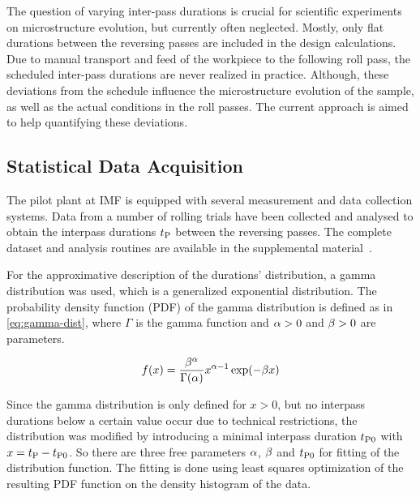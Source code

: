 The question of varying inter-pass durations is crucial for scientific experiments on microstructure evolution, but currently often neglected.
Mostly, only flat durations between the reversing passes are included in the design calculations.
Due to manual transport and feed of the workpiece to the following roll pass, the scheduled inter-pass durations are never realized in practice.
Although, these deviations from the schedule influence the microstructure evolution of the sample, as well as the actual conditions in the roll passes.
The current approach is aimed to help quantifying these deviations.

\subsection{Statistical Data Acquisition}\label{subsec:data-acquisition}

The pilot plant at IMF is equipped with several measurement and data collection systems.
Data from a number of rolling trials have been collected and analysed to obtain the interpass durations ${t_\mathrm{P}}$ between the reversing passes.
The complete dataset and analysis routines are available in the supplemental material~\cite{esaform2023_weiner_supp}.

For the approximative description of the durations' distribution, a gamma distribution was used, which is a generalized exponential distribution.
The probability density function (PDF) of the gamma distribution is defined as in \autoref{eq:gamma-dist}, where $\Gamma$ is the gamma function and ${\alpha} > 0$ and ${\beta} > 0$ are parameters.

\begin{equation}
    f(x) = \frac{{\beta}^{\alpha}}{\Gamma({\alpha})}x^{{\alpha} - 1} \exp(-{\beta} x)
    \label{eq:gamma-dist}
\end{equation}

Since the gamma distribution is only defined for $x>0$, but no interpass durations below a certain value occur due to technical restrictions, the distribution was modified by introducing a minimal interpass duration ${t_\mathrm{P0}}$ with $x = {t_\mathrm{P}} - {t_\mathrm{P0}}$.
So there are three free parameters ${\alpha}$, ${\beta}$ and ${t_\mathrm{P0}}$ for fitting of the distribution function.
The fitting is done using least squares optimization of the resulting PDF function on the density histogram of the data.

